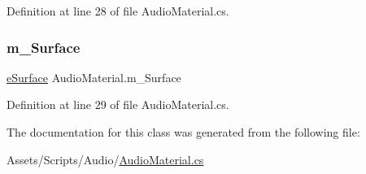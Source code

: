 Definition at line 28 of file Audio\+Material.\+cs.

\mbox{\label{class_audio_material_a8dc4e2653bf8b1bcc91f5bfd13eb2987}} 
\subsubsection{\texorpdfstring{m\+\_\+\+Surface}{m\_Surface}}
{\footnotesize\ttfamily \mbox{\hyperlink{class_audio_material_a0eaec8dca6445f5aa32e1146666cfe49}{e\+Surface}} Audio\+Material.\+m\+\_\+\+Surface}



Definition at line 29 of file Audio\+Material.\+cs.



The documentation for this class was generated from the following file\+:\begin{DoxyCompactItemize}
\item 
Assets/\+Scripts/\+Audio/\mbox{\hyperlink{_audio_material_8cs}{Audio\+Material.\+cs}}\end{DoxyCompactItemize}
